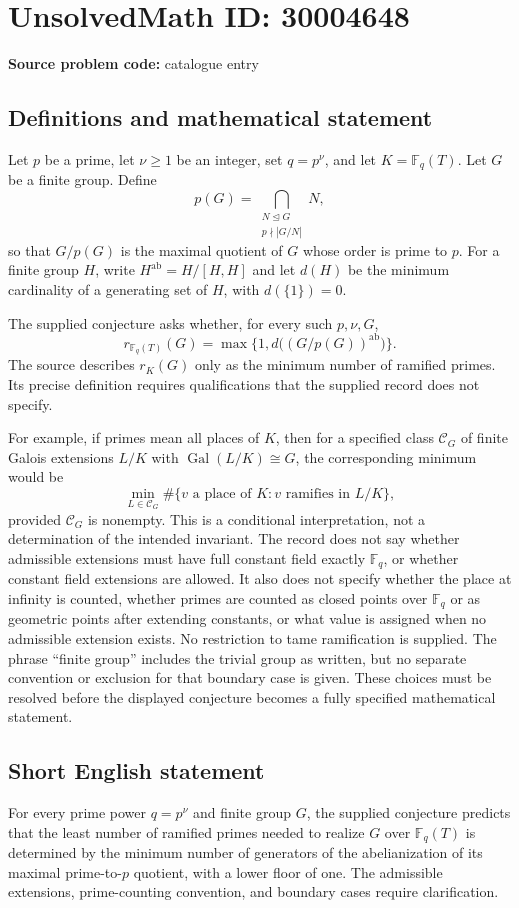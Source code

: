 \documentclass[11pt]{article}
\newcommand{\F}{\mathbb{F}}
\begin{document}
\section*{UnsolvedMath ID: 30004648}
\textbf{Source problem code:} catalogue entry
\subsection{Definitions and mathematical statement}
Let \(p\) be a prime, let \(\nu\geq 1\) be an integer, set \(q=p^\nu\), and let \(K=\F_q(T)\). Let \(G\) be a finite group. Define
\[
p(G)=\bigcap_{\substack{N\trianglelefteq G\\p\nmid |G/N|}}N,
\]
so that \(G/p(G)\) is the maximal quotient of \(G\) whose order is prime to \(p\). For a finite group \(H\), write \(H^{\mathrm{ab}}=H/[H,H]\) and let \(d(H)\) be the minimum cardinality of a generating set of \(H\), with \(d(\{1\})=0\).

The supplied conjecture asks whether, for every such \(p,\nu,G\),
\[
r_{\F_q(T)}(G)=\max\bigl\{1,d\bigl((G/p(G))^{\mathrm{ab}}\bigr)\bigr\}.
\]
The source describes \(r_K(G)\) only as the minimum number of ramified primes. Its precise definition requires qualifications that the supplied record does not specify.

For example, if primes mean all places of \(K\), then for a specified class \(\mathcal C_G\) of finite Galois extensions \(L/K\) with \(\operatorname{Gal}(L/K)\cong G\), the corresponding minimum would be
\[
\min_{L\in\mathcal C_G}
\#\{v\text{ a place of }K:v\text{ ramifies in }L/K\},
\]
provided \(\mathcal C_G\) is nonempty. This is a conditional interpretation, not a determination of the intended invariant. The record does not say whether admissible extensions must have full constant field exactly \(\F_q\), or whether constant field extensions are allowed. It also does not specify whether the place at infinity is counted, whether primes are counted as closed points over \(\F_q\) or as geometric points after extending constants, or what value is assigned when no admissible extension exists. No restriction to tame ramification is supplied. The phrase ``finite group'' includes the trivial group as written, but no separate convention or exclusion for that boundary case is given. These choices must be resolved before the displayed conjecture becomes a fully specified mathematical statement.
\subsection{Short English statement}
For every prime power \(q=p^\nu\) and finite group \(G\), the supplied conjecture predicts that the least number of ramified primes needed to realize \(G\) over \(\F_q(T)\) is determined by the minimum number of generators of the abelianization of its maximal prime-to-\(p\) quotient, with a lower floor of one. The admissible extensions, prime-counting convention, and boundary cases require clarification.
\end{document}
